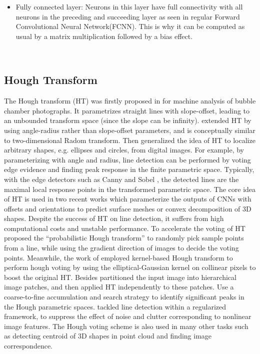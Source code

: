 \begin{itemize}
\item Fully connected layer: Neurons in this layer have full connectivity with all neurons in the preceding and succeeding layer as seen in regular Forward Convolutional Neural Network(FCNN). This is why it can be computed as usual by a matrix multiplication followed by a bias effect.
\end{itemize}\\

\subsection{Hough Transform}
The Hough transform (HT) was firstly proposed in for machine analysis of bubble chamber photographs. It parametrizes straight lines with slope-offset, leading to an unbounded transform space (since the slope can be infinity). extended HT by using angle-radius rather than slope-offset parameters, and is conceptually similar to two-dimensional Radom transform. Then generalized the idea of HT to localize arbitrary shapes, e.g. ellipses and circles, from digital images. For example, by parameterizing with angle and radius, line detection can be performed by voting edge evidence and finding peak response in the finite parametric space. Typically, with the edge detectors such as Canny  and Sobel , the detected lines are the maximal local response points in the transformed parametric space. The core idea of HT is used in two recent works which parameterize the outputs of CNNs with offsets and orientations to predict surface meshes  or convex decomposition  of 3D shapes. Despite the success of HT on line detection, it suffers from high computational costs and unstable performance. To accelerate the voting of HT proposed the “probabilistic Hough transform” to randomly pick sample points from a line, while  using the gradient direction of images to decide the voting points. Meanwhile, the work of employed kernel-based Hough transform to perform hough voting by using the elliptical-Gaussian kernel on collinear pixels to boost the original HT. Besides partitioned the input image into hierarchical image patches, and then applied HT independently to these patches. Use a coarse-to-fine accumulation and search strategy to identify significant peaks in the Hough parametric spaces. tackled line detection within a regularized framework, to suppress the effect of noise and clutter corresponding to nonlinear image features. The Hough voting scheme is also used in many other tasks such as detecting centroid of 3D shapes in point cloud and finding image correspondence.

